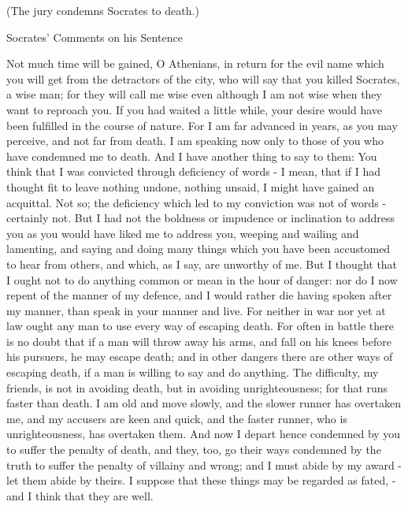 (The jury condemns Socrates to death.)

Socrates' Comments on his Sentence

Not much time will be gained, O Athenians, in return for the evil
name which you will get from the detractors of the city, who will
say that you killed Socrates, a wise man; for they will call me wise
even although I am not wise when they want to reproach you. If you
had waited a little while, your desire would have been fulfilled in
the course of nature. For I am far advanced in years, as you may perceive,
and not far from death. I am speaking now only to those of you who
have condemned me to death. And I have another thing to say to them:
You think that I was convicted through deficiency of words - I mean,
that if I had thought fit to leave nothing undone, nothing unsaid,
I might have gained an acquittal. Not so; the deficiency which led
to my conviction was not of words - certainly not. But I had not the
boldness or impudence or inclination to address you as you would have
liked me to address you, weeping and wailing and lamenting, and saying
and doing many things which you have been accustomed to hear from
others, and which, as I say, are unworthy of me. But I thought that
I ought not to do anything common or mean in the hour of danger: nor
do I now repent of the manner of my defence, and I would rather die
having spoken after my manner, than speak in your manner and live.
For neither in war nor yet at law ought any man to use every way of
escaping death. For often in battle there is no doubt that if a man
will throw away his arms, and fall on his knees before his pursuers,
he may escape death; and in other dangers there are other ways of
escaping death, if a man is willing to say and do anything. The difficulty,
my friends, is not in avoiding death, but in avoiding unrighteousness;
for that runs faster than death. I am old and move slowly, and the
slower runner has overtaken me, and my accusers are keen and quick,
and the faster runner, who is unrighteousness, has overtaken them.
And now I depart hence condemned by you to suffer the penalty of death,
and they, too, go their ways condemned by the truth to suffer the
penalty of villainy and wrong; and I must abide by my award - let
them abide by theirs. I suppose that these things may be regarded
as fated, - and I think that they are well. 

